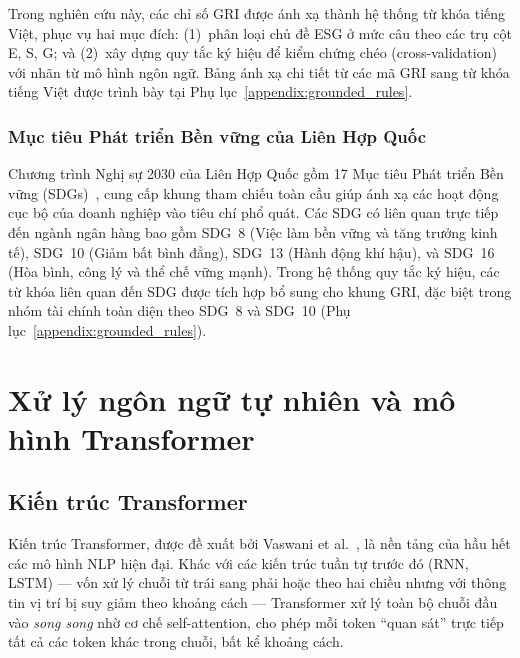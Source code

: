 Trong nghiên cứu này, các chỉ số GRI được ánh xạ thành hệ thống từ khóa tiếng Việt, phục vụ hai mục đích: (1)~phân loại chủ đề ESG ở mức câu theo các trụ cột E, S, G; và (2)~xây dựng quy tắc ký hiệu để kiểm chứng chéo (cross-validation) với nhãn từ mô hình ngôn ngữ. Bảng ánh xạ chi tiết từ các mã GRI sang từ khóa tiếng Việt được trình bày tại Phụ lục~\ref{appendix:grounded_rules}.


\subsubsection{Mục tiêu Phát triển Bền vững của Liên Hợp Quốc}

Chương trình Nghị sự 2030 của Liên Hợp Quốc gồm 17 Mục tiêu Phát triển Bền vững (SDGs)~\cite{un_sdgs_2015}, cung cấp khung tham chiếu toàn cầu giúp ánh xạ các hoạt động cục bộ của doanh nghiệp vào tiêu chí phổ quát. Các SDG có liên quan trực tiếp đến ngành ngân hàng bao gồm SDG~8 (Việc làm bền vững và tăng trưởng kinh tế), SDG~10 (Giảm bất bình đẳng), SDG~13 (Hành động khí hậu), và SDG~16 (Hòa bình, công lý và thể chế vững mạnh). Trong hệ thống quy tắc ký hiệu, các từ khóa liên quan đến SDG được tích hợp bổ sung cho khung GRI, đặc biệt trong nhóm tài chính toàn diện theo SDG~8 và SDG~10 (Phụ lục~\ref{appendix:grounded_rules}).


\section{Xử lý ngôn ngữ tự nhiên và mô hình Transformer}
\label{sec:nlp_transformer}

\subsection{Kiến trúc Transformer}
\label{subsec:transformer}

Kiến trúc Transformer, được đề xuất bởi Vaswani et al.~\cite{vaswani2017attention}, là nền tảng của hầu hết các mô hình NLP hiện đại. Khác với các kiến trúc tuần tự trước đó (RNN, LSTM) --- vốn xử lý chuỗi từ trái sang phải hoặc theo hai chiều nhưng với thông tin vị trí bị suy giảm theo khoảng cách --- Transformer xử lý toàn bộ chuỗi đầu vào \textit{song song} nhờ cơ chế self-attention, cho phép mỗi token ``quan sát'' trực tiếp tất cả các token khác trong chuỗi, bất kể khoảng cách.

